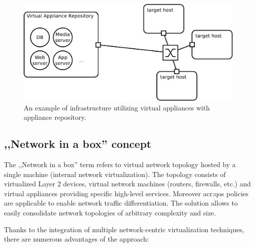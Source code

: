 \documentclass[11pt]{book}
\begin{document}

        \begin{figure}[H]
          \begin{center}
            \includegraphics[width=.7\textwidth]{img/solaris/virtual-appliance-infra.pdf}
          \end{center}

          \caption{An example of infrastructure utilizing virtual appliances with appliance repository.}
        \end{figure}


      \subsection{,,Network in a box'' concept}

        The ,,Network in a box'' term refers to virtual network topology hosted by a single machine (internal network
        virtualization). The topology consists of virtualized Layer 2 devices, virtual network machines (routers,
        firewalls, etc.) and virtual appliances providing specific high-level services. Moreover \gls{acr:qos} policies
        are applicable to enable network traffic differentiation. The solution allows to easily consolidate network
        topologies of arbitrary complexity and size.

        Thanks to the integration of multiple network-centric virtualization techniques, there are numerous advantages
        of the approach:
\end{document}
